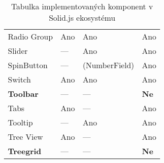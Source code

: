 \begin{table}[ht]
\begin{tabularx}{\textwidth}{Y Y Y Y}
        Radio Group           & Ano                   & Ano                & Ano                               \\
        Slider                & ---                   & Ano                & Ano                               \\
        SpinButton            & ---                   & (NumberField)      & Ano                               \\
        Switch                & Ano                   & Ano                & Ano                               \\
        \textbf{Toolbar}      & ---                   & ---                & \textbf{Ne}                       \\
        Tabs                  & Ano                   & ---                & Ano                               \\
        Tooltip               & ---                   & Ano                & Ano                               \\
        Tree View             & Ano                   & ---                & Ano                               \\
        \textbf{Treegrid}     & ---                   & ---                & \textbf{Ne}
    \end{tabularx}
    \caption{Tabulka implementovaných komponent v Solid.js ekosystému}
\end{table}
